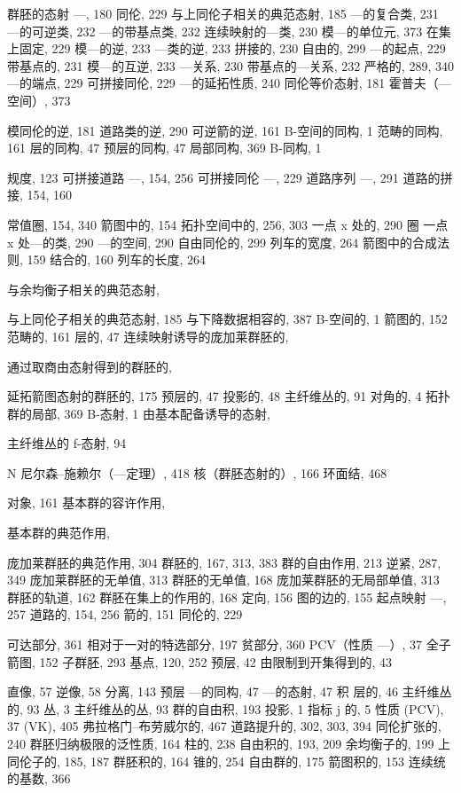 群胚的态射 ---, 180 同伦, 229 与上同伦子相关的典范态射, 185 ---的复合类, 231 ---的可逆类, 232 ---的带基点类, 232 连续映射的---类, 230 模---的单位元, 373 在集上固定, 229 模---的逆, 233 ---类的逆, 233 拼接的, 230 自由的, 299 ---的起点, 229 带基点的, 231 模---的互逆, 233 ---关系, 230 带基点的---关系, 232 严格的, 289, 340 ---的端点, 229 可拼接同伦, 229 ---的延拓性质, 240 同伦等价态射, 181 霍普夫（---空间）, 373


模同伦的逆, 181 道路类的逆, 290 可逆箭的逆, 161 B-空间的同构, 1 范畴的同构, 161 层的同构, 47 预层的同构, 47 局部同构, 369 B-同构, 1


规度, 123 可拼接道路 ---, 154, 256 可拼接同伦 ---, 229 道路序列 ---, 291 道路的拼接, 154, 160


常值圈, 154, 340 箭图中的, 154 拓扑空间中的, 256, 303 一点 x 处的, 290 圈 一点 x 处---的类, 290 ---的空间, 290 自由同伦的, 299 列车的宽度, 264 箭图中的合成法则, 159 结合的, 160 列车的长度, 264


与余均衡子相关的典范态射,

与上同伦子相关的典范态射, 185 与下降数据相容的, 387 B-空间的, 1 箭图的, 152 范畴的, 161 层的, 47 连续映射诱导的庞加莱群胚的,

通过取商由态射得到的群胚的,

延拓箭图态射的群胚的, 175 预层的, 47 投影的, 48 主纤维丛的, 91 对角的, 4 拓扑群的局部, 369 B-态射, 1 由基本配备诱导的态射,

主纤维丛的 f-态射, 94

N 尼尔森–施赖尔（---定理）, 418 核（群胚态射的）, 166 环面结, 468


对象, 161 基本群的容许作用,

基本群的典范作用,

庞加莱群胚的典范作用, 304 群胚的, 167, 313, 383 群的自由作用, 213 逆紧, 287, 349 庞加莱群胚的无单值, 313 群胚的无单值, 168 庞加莱群胚的无局部单值, 313 群胚的轨道, 162 群胚在集上的作用的, 168 定向, 156 图的边的, 155 起点映射 ---, 257 道路的, 154, 256 箭的, 151 同伦的, 229


可达部分, 361 相对于一对的特选部分, 197 贫部分, 360 PCV（性质 ---）, 37 全子箭图, 152 子群胚, 293 基点, 120, 252 预层, 42 由限制到开集得到的, 43

直像, 57 逆像, 58 分离, 143 预层 ---的同构, 47 ---的态射, 47 积 层的, 46 主纤维丛的, 93 丛, 3 主纤维丛的丛, 93 群的自由积, 193 投影, 1 指标 j 的, 5 性质 (PCV), 37 (VK), 405 弗拉格门–布劳威尔的, 467 道路提升的, 302, 303, 394 同伦扩张的, 240 群胚归纳极限的泛性质, 164 柱的, 238 自由积的, 193, 209 余均衡子的, 199 上同伦子的, 185, 187 群胚积的, 164 锥的, 254 自由群的, 175 箭图积的, 153 连续统的基数, 366


